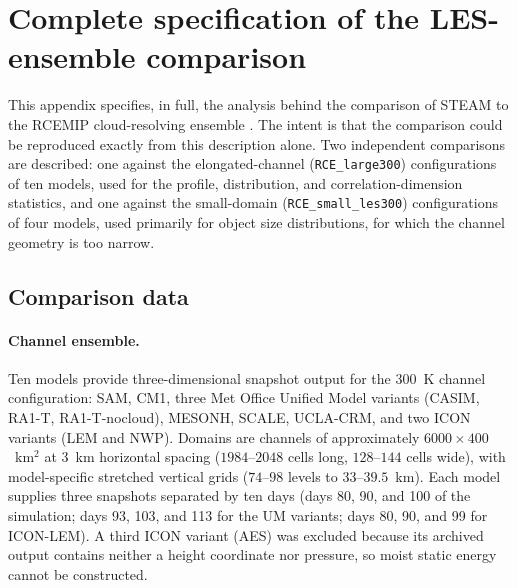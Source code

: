 
\section{Complete specification of the LES-ensemble comparison}
\label{sect:rcemip analysis}

This appendix specifies, in full, the analysis behind the comparison of
STEAM to the RCEMIP cloud-resolving ensemble
\citep[][]{wing2018,wing2020}. The intent is that the comparison could be
reproduced exactly from this description alone. Two independent
comparisons are described: one against the elongated-channel
(\texttt{RCE\_large300}) configurations of ten models, used for the
profile, distribution, and correlation-dimension statistics, and one
against the small-domain (\texttt{RCE\_small\_les300}) configurations of
four models, used primarily for object size distributions, for which the
channel geometry is too narrow.

\subsection{Comparison data}
\label{sect:rcemip data}

\paragraph{Channel ensemble.} Ten models provide three-dimensional
snapshot output for the 300~K channel configuration: SAM, CM1, three Met
Office Unified Model variants (CASIM, RA1-T, RA1-T-nocloud), MESONH,
SCALE, UCLA-CRM, and two ICON variants (LEM and NWP). Domains are
channels of approximately $6000\times 400$~km$^2$ at 3~km horizontal
spacing ($1984$--$2048$ cells long, $128$--$144$ cells wide), with
model-specific stretched vertical grids ($74$--$98$ levels to
$33$--$39.5$~km). Each model supplies three snapshots separated by ten
days (days 80, 90, and 100 of the simulation; days 93, 103, and 113 for
the UM variants; days 80, 90, and 99 for ICON-LEM). A third ICON variant
(AES) was excluded because its archived output contains neither a height
coordinate nor pressure, so moist static energy cannot be constructed.


